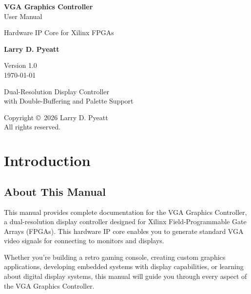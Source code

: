 \documentclass[11pt,letterpaper]{report}
\begin{document}
\begin{titlepage}
    \centering
    \vspace*{2cm}
    
    {\Huge\bfseries VGA Graphics Controller\\[0.5cm]}
    {\LARGE User Manual\\[2cm]}
    
    {\Large Hardware IP Core for Xilinx FPGAs\\[1cm]}
    
    \vfill
    
    {\large\textbf{Larry D. Pyeatt}\\[1cm]}
    
    {\large Version 1.0\\[0.5cm]}
    {\large \today\\[2cm]}
    
    \vfill
    
    {\large Dual-Resolution Display Controller\\
    with Double-Buffering and Palette Support\\[2cm]}
    
    \vfill
    
    {\footnotesize Copyright \copyright\ 2026 Larry D. Pyeatt\\
    All rights reserved.}
    
\end{titlepage}

\tableofcontents
\listoftables
\listoffigures

\chapter{Introduction}

\section{About This Manual}

This manual provides complete documentation for the VGA Graphics Controller, a dual-resolution display controller designed for Xilinx Field-Programmable Gate Arrays (FPGAs). This hardware IP core enables you to generate standard VGA video signals for connecting to monitors and displays.

Whether you're building a retro gaming console, creating custom graphics applications, developing embedded systems with display capabilities, or learning about digital display systems, this manual will guide you through every aspect of the VGA Graphics Controller.
\end{document}
